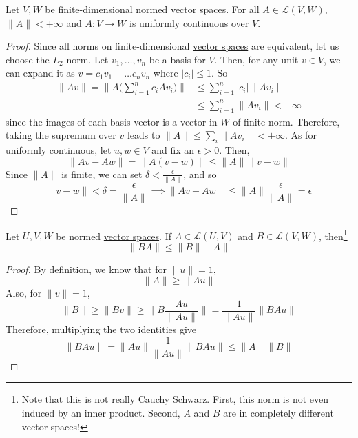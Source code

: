 	\begin{lemma}
	  \label{thm:uniform-continuity-of-linear-maps}
		Let $V, W$ be finite-dimensional normed \hyperref[def:vector-space]{vector spaces}. For all $A \in \mathcal{L}(V, W)$, $\|A\| < +\infty$ and $A: V \to W$ is uniformly continuous over $V$. 
	\end{lemma}
	\begin{proof}
		Since all norms on finite-dimensional \hyperref[def:vector-space]{vector spaces} are equivalent, let us choose the $L_2$ norm. Let $v_1, \ldots, v_n$ be a basis for $V$. Then, for any unit $v \in V$, we can expand it as $v = c_1 v_1 + \ldots c_n v_n$ where $|c_i| \leq 1$. So
		\begin{align}
			\|Av\| = \bigg\| A \bigg( \sum_{i=1}^n c_i A v_i \bigg) \bigg\| 
				& \leq \sum_{i=1}^n |c_i| \|A v_i\| \\ 
				& \leq \sum_{i=1}^n \|A v_i\| < +\infty
		\end{align} 
		since the images of each basis vector is a vector in $W$ of finite norm. Therefore, taking the supremum over $v$ leads to $\|A\| \leq \sum_i \|A v_i\| < +\infty$. As for uniformly continuous, let $u, w \in V$ and fix an $\epsilon > 0$. Then, 
		\begin{equation}
		  \|Av - Aw\| = \|A(v - w)\| \leq \|A\| \|v - w\| 
		\end{equation}
		Since $\|A\|$ is finite, we can set $\delta < \frac{\epsilon}{\|A\|}$, and so 
		\begin{equation}
			\|v - w\| < \delta = \frac{\epsilon}{\|A\|} \implies \|Av - Aw\| \leq \|A\| \frac{\epsilon}{\|A\|} = \epsilon
		\end{equation}
	\end{proof}

	\begin{lemma}
	  \label{thm:cauchy-schwarz-sort-of}
		Let $U, V, W$ be normed \hyperref[def:vector-space]{vector spaces}. If $A \in \mathcal{L}(U, V)$ and $B \in \mathcal{L}(V, W)$, then\footnote{Note that this is not really Cauchy Schwarz. First, this norm is not even induced by an inner product. Second, $A$ and $B$ are in completely different vector spaces!}
		\begin{equation}
		  \|BA\| \leq \|B\| \|A\|
		\end{equation}
	\end{lemma}
	\begin{proof}
		By definition, we know that for $\|u\| = 1$, 
		\begin{equation}
		  \|A\| \geq \|A u\|
		\end{equation}
		Also, for $\|v\| = 1$, 
		\begin{equation}
			\|B\| \geq \|Bv\| \geq \bigg\| B \frac{Au}{\|Au\|} \bigg\| = \frac{1}{\|Au\|} \|BAu\| 
		\end{equation}
		Therefore, multiplying the two identities give 
		\begin{equation}
			\|BAu\| = \|Au\| \frac{1}{\|Au\|} \|BAu\| \leq \|A\| \|B\|
		\end{equation}
	\end{proof}


